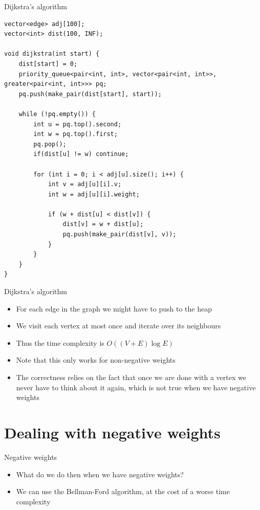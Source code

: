 \documentclass{beamer}
\begin{document}
\begin{frame}{Dijkstra's algorithm}
    \tiny
    \begin{verbatim}
vector<edge> adj[100];
vector<int> dist(100, INF);

void dijkstra(int start) {
    dist[start] = 0;
    priority_queue<pair<int, int>, vector<pair<int, int>>, greater<pair<int, int>>> pq;
    pq.push(make_pair(dist[start], start));

    while (!pq.empty()) {
        int u = pq.top().second;
        int w = pq.top().first;
        pq.pop();
        if(dist[u] != w) continue;

        for (int i = 0; i < adj[u].size(); i++) {
            int v = adj[u][i].v;
            int w = adj[u][i].weight;

            if (w + dist[u] < dist[v]) {
                dist[v] = w + dist[u];
                pq.push(make_pair(dist[v], v));
            }
        }
    }
}
    \end{verbatim}
\end{frame}

\begin{frame}[plain]{Dijkstra's algorithm}
    \begin{itemize}
    \item For each edge in the graph we might have to push to the heap
    \item We visit each vertex at most once and iterate over its neighbours
        \item Thus the time complexity is $O((V + E) \log E)$
        \vspace{10pt}
        \item Note that this only works for non-negative weights
        \item The correctness relies on the fact that once we are done with a vertex we never have to think about it again, which is not true when we have negative weights
    \end{itemize}
\end{frame}

\section*{Dealing with negative weights}

\begin{frame}[plain]{Negative weights}
    \begin{itemize}
    \item What do we do then when we have negative weights?
    \item We can use the Bellman-Ford algorithm, at the cost of a worse time complexity
    \end{itemize}
\end{frame}
\end{document}
